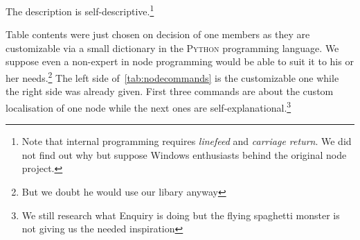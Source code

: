 The description is self-descriptive.\footnote{Note that internal programming requires \textit{linefeed} and \textit{carriage return}. We did not find out 
why but suppose Windows enthusiasts behind the original node project.}

Table contents were just chosen on decision of one members as they are customizable via a small dictionary in the \textsc{Python} programming language. We 
suppose even a non-expert in node programming would be able to suit it to his or her needs.\footnote{But we doubt he would use our libary anyway}
The left side of~\ref{tab:nodecommands} is the customizable one while the right side was already given. First three commands are about the 
custom localisation of one node while the next ones are self-explanational.\footnote{We still research what Enquiry is doing but the flying spaghetti monster is not giving us the needed inspiration}

